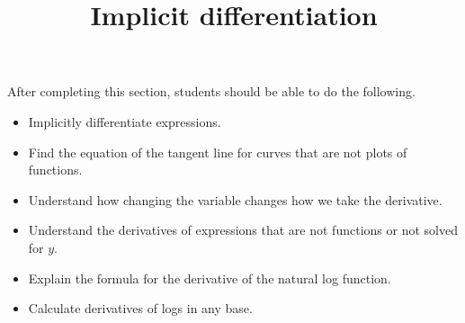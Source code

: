 \documentclass{ximera}
\title{Implicit differentiation}
\begin{document}
\begin{abstract}
\end{abstract}

\maketitle

\begin{sectionOutcomes}

After completing this section, students should be able to do the following.

\begin{itemize}
	\item Implicitly differentiate expressions.
	\item Find the equation of the tangent line for curves that
          are not plots of functions.
	\item Understand how changing the variable changes how we take
          the derivative.
	\item Understand the derivatives of expressions that are not
          functions or not solved for $y$.
          \item Explain the formula for the derivative of the natural log function.
	\item Calculate derivatives of logs in any base.
\end{itemize}

\end{sectionOutcomes}
\end{document}
